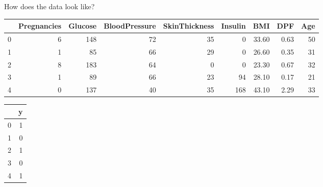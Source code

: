 \documentclass[obeyspaces,aspectratio=43]{beamer}
\begin{document}
\begin{frame}{How does the data look like?}

\center
\tiny

\begin{tabular}{lrrrrrrrr}
\toprule
{} &  Pregnancies &  Glucose &  BloodPressure &  SkinThickness &  Insulin &   BMI &  DPF &  Age \\
\midrule
0 &            6 &      148 &             72 &             35 &        0 & 33.60 &                      0.63 &   50 \\
1 &            1 &       85 &             66 &             29 &        0 & 26.60 &                      0.35 &   31 \\
2 &            8 &      183 &             64 &              0 &        0 & 23.30 &                      0.67 &   32 \\
3 &            1 &       89 &             66 &             23 &       94 & 28.10 &                      0.17 &   21 \\
4 &            0 &      137 &             40 &             35 &      168 & 43.10 &                      2.29 &   33 \\
\bottomrule
\end{tabular}

\begin{tabular}{lr}
\toprule
{} &  y \\
\midrule
0 &        1 \\
1 &        0 \\
2 &        1 \\
3 &        0 \\
4 &        1 \\
\bottomrule
\end{tabular}

\end{frame}

\begin{frame}{Decision Tree}

\texttt{[image: ./graphics/\{tree\_class\_diab]}.png}

\end{frame}
\end{document}
